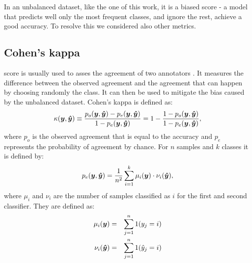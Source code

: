 In an
unbalanced dataset, like the one of this work, it is a biased score -
a model that predicts well only the most frequent classes, and ignore
the rest, achieve a good accuracy. To resolve this we considered also
other metrics.

\subsection{Cohen's kappa} score is usually used to asses
the agreement of two annotators \cite{cohen_coefficient_1960}. It
measures the difference between the observed agreement and the
agreement that can happen by choosing randomly the class. It can then
be used to mitigate the bias caused by the unbalanced dataset. Cohen's
kappa is defined as:
\begin{equation*}
  \kappa(\bm{y}, \bm{\hat y})\equiv \frac{p_o(\bm{y}, \bm{\hat y}) -p_e(\bm{y}, \bm{\hat y})}{1-p_e(\bm{y}, \bm{\hat y})} = 1-\frac{1-p_o(\bm{y}, \bm{\hat y})}{1-p_e(\bm{y}, \bm{\hat y})},
\end{equation*}
where $p_o$ is the observed agreement that is equal to the accuracy
and $p_e$ represents the probability of agreement by chance. For $n$
samples and $k$ classes it is
defined by:
\begin{equation*}
  p_e(\bm{y}, \bm{\hat y}) = \frac{1}{n^2}\sum_{i=1}^{k} \mu_{i}(\bm{y})\cdot\nu_{i}(\bm{\hat y}),
\end{equation*}
where $\mu_{i}$ and $\nu_{i}$ are the number of samples classified as
$i$ for the first and second classifier. They are defined as:
\begin{eqnarray*}
  \mu_i(\bm{y}) &=& \sum_{j=1}^{n}1(y_j = i)\\
  \nu_i(\bm{\hat y}) &=& \sum_{j=1}^{n}1(\hat y_j = i)
\end{eqnarray*}

